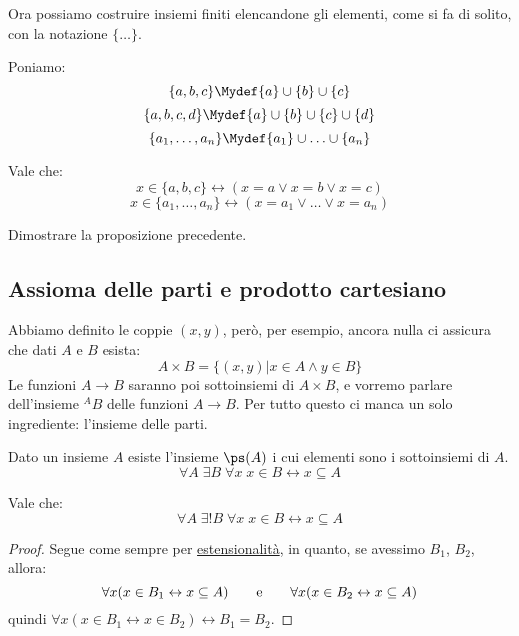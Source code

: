 \documentclass[11pt]{scrartcl}
\begin{document}
Ora possiamo costruire insiemi finiti elencandone gli elementi, come si fa di solito, con la notazione $\{\ldots\}$.

\begin{notation}
	Poniamo:
	\[ \{a,b,c\} \Mydef \{a\} \cup \{b\} \cup \{c\}
		\]\[ \{a,b,c,d\} \Mydef \{a\} \cup \{b\} \cup \{c\} \cup \{d\}
			\]\[ \{a_1,\ldots,a_n\} \Mydef \{a_1\} \cup \ldots \cup \{a_n\}
				\]
\end{notation}

\begin{proposition}
	Vale che:
	\[ x \in \{a,b,c\} \leftrightarrow (x = a \lor x = b \lor x = c)
		\]\[ x \in \{a_1,\ldots,a_n\} \leftrightarrow (x = a_1 \lor \ldots \lor x = a_n) 
			\]
\end{proposition}

\begin{exercise}
	Dimostrare la proposizione precedente.
\end{exercise}

\subsection{Assioma delle parti e prodotto cartesiano}
Abbiamo definito le coppie $(x,y)$, però, per esempio, ancora nulla ci assicura che dati $A$ e $B$ esista:
\[ A \times B = \{(x,y) | x \in A \land y \in B\}
	\]
Le funzioni $A \longrightarrow B$ saranno poi sottoinsiemi di $A \times B$, e vorremo parlare dell'insieme ${}^{A}B$
delle funzioni $A \longrightarrow B$. Per tutto questo ci manca un solo ingrediente: l'insieme delle parti.

\begin{axiom}
	\label{ax6}
	Dato un insieme $A$ esiste l'insieme $\ps(A)$ i cui elementi sono i sottoinsiemi di $A$.
	\[ \forall A \; \exists B \; \forall x \; x \in B \leftrightarrow x \subseteq A 
		\]
\end{axiom}

\begin{proposition}
	Vale che:
	\[\forall A \; \exists ! B \; \forall x \; x \in B \leftrightarrow x \subseteq A 
		\]
\end{proposition}

\begin{proof}
	Segue come sempre per \hyperref[ax2]{estensionalità}, in quanto, se avessimo $B_1$, $B_2$, allora:
	\[ \forall x (x \in B_1 \leftrightarrow x \subseteq A) \qquad \text e \qquad \forall x(x \in B_2 \leftrightarrow x \subseteq A)
		\]
	quindi $\forall x(x \in B_1 \leftrightarrow x \in B_2) \leftrightarrow B_1 = B_2$.
\end{proof}
\end{document}

